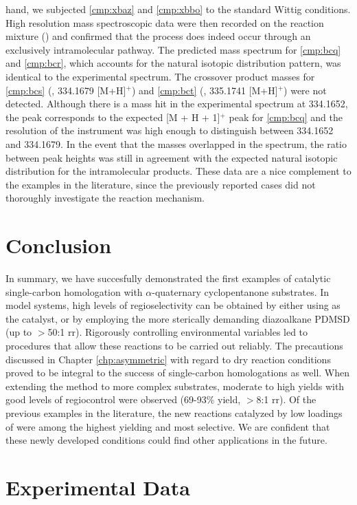 hand, we subjected \ref{cmp:xbaz} and \ref{cmp:xbbo} to the standard Wittig conditions. High
resolution mass spectroscopic data were then recorded on the reaction mixture
() and confirmed that the process does indeed occur through an exclusively
intramolecular pathway. The predicted mass spectrum for
\ref{cmp:bcq} and \ref{cmp:bcr}, which accounts for the natural isotopic distribution pattern, was
identical to the experimental spectrum. The crossover product masses for \ref{cmp:bcs}
(, 334.1679 [M+H]$^+$) and \ref{cmp:bct} (, 335.1741 [M+H]$^+$)
were not detected. Although there is a mass hit in the experimental spectrum at 334.1652, the peak
corresponds to the expected [M + H + 1]$^+$ peak for \ref{cmp:bcq} and the resolution of the
instrument was high enough to distinguish between 334.1652 and 334.1679. In the event that the masses overlapped in
the spectrum, the ratio between peak heights was still in agreement with the expected natural
isotopic distribution for the intramolecular products. These
data are a nice complement to the examples in the literature, since the previously reported cases
did not thoroughly investigate the reaction mechanism. 




\pagebreak
\section{Conclusion}

In summary, we have succesfully demonstrated the first examples of catalytic single-carbon
homologation with $\alpha$-quaternary cyclopentanone substrates. In model systems, high levels of
regioselectivity can be obtained by either using  as the catalyst, or by employing the
more sterically demanding diazoalkane PDMSD (up to $>$50:1 rr). Rigorously controlling environmental
variables led to procedures that allow these reactions to be carried out reliably. The precautions
discussed in Chapter \ref{chp:asymmetric} with regard to dry reaction conditions proved to be
integral to the success of single-carbon homologations as well. When extending the method to more
complex substrates, moderate to high yields with good levels of regiocontrol were observed (69-93\% yield, $>$8:1 rr). Of the previous examples in the literature, the new reactions catalyzed by low loadings of  were among the highest yielding and most selective. We are confident that these newly developed conditions could find other applications in the future. 

\pagebreak
\section{Experimental Data}
